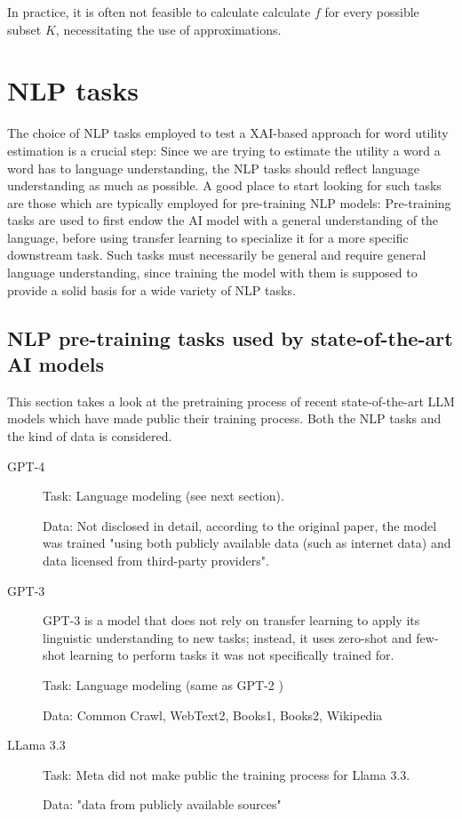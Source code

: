 In practice, it is often not feasible to calculate calculate $f$ for every possible subset $K$, necessitating the use of approximations.



\section{NLP tasks}
The choice of NLP tasks employed to test a XAI-based approach for word utility estimation is a crucial step:
Since we are trying to estimate the utility a word a word has to language understanding, the NLP tasks should reflect language understanding as much as possible.
A good place to start looking for such tasks are those which are typically employed for pre-training NLP models:
Pre-training tasks are used to first endow the AI model with a general understanding of the language, before using transfer learning to specialize it for a more specific downstream task.
Such tasks must necessarily be general and require general language understanding, since training the model with them is supposed to provide a solid basis for a wide variety of NLP tasks.

\subsection{NLP pre-training tasks used by state-of-the-art AI models}
This section takes a look at the pretraining process of recent state-of-the-art LLM models which have made public their training process.
Both the NLP tasks and the kind of data is considered.


\begin{description}
	\item[GPT-4] \cite{openaiGPT4TechnicalReport2024}

	      Task: Language modeling (see next section).

	      Data: Not disclosed in detail, according to the original paper, the model was trained "using both publicly available data (such as internet data) and data licensed from third-party providers".
	\item[GPT-3] \cite{brownLanguageModelsAre2020}
	      GPT-3 is a model that does not rely on transfer learning to apply its linguistic understanding to new tasks; instead, it uses zero-shot and few-shot learning to perform tasks it was not specifically trained for.

	      Task: Language modeling (same as GPT-2 \cite{radfordLanguageModelsAre2019})

	      Data: Common Crawl, WebText2, Books1, Books2, Wikipedia 
	\item[LLama 3.3] \cite{LlamamodelsModelsLlama3_3}


	      Task: Meta did not make public the training process for Llama 3.3.

	      Data: "data from publicly available sources"
\end{description}

